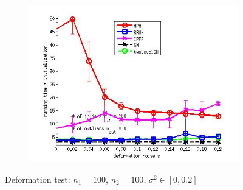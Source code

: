 \begin{figure}[h]
\begin{subfigure}[b]{0.3\textwidth}
		\includegraphics[scale=0.25]{"chapter3/fig/SyntheticTest/ver4.3.2/deformation/time_summary_avg10t"} 
	\end{subfigure} 	
	\caption{Deformation test: $n_1=100$, $n_2=100$, $\sigma^2\in[0, 0.2]$}
	\label{fig:syntest1_ver432}
\end{figure}

\FloatBarrier	

